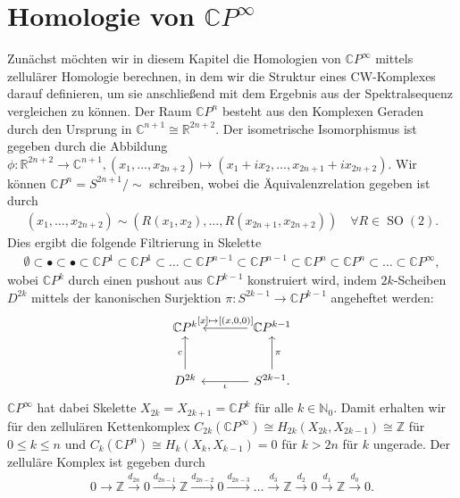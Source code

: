 \documentclass[12pt, hidelinks]{article}
\numberwithin{conj}{section}
\begin{document}
\section{Homologie von $\mathbb{C}P^\infty$}
Zunächst möchten wir in diesem Kapitel die Homologien von $\mathbb{C}P^\infty$ mittels zellulärer Homologie berechnen, in dem wir die Struktur eines CW-Komplexes darauf definieren, um sie anschließend mit dem Ergebnis aus der Spektralsequenz vergleichen zu können. Der Raum $\mathbb{C}P^n$ besteht aus den Komplexen Geraden durch den Ursprung in $\mathbb{C}^{n+1} \cong \mathbb{R}^{2n+2}$. Der isometrische Isomorphismus ist gegeben durch die Abbildung $\phi: \mathbb{R}^{2n+2} \to \mathbb{C}^{n+1}, (x_1, \ldots, x_{2n+2}) \mapsto (x_1 + ix_2, \ldots, x_{2n+1} + ix_{2n+2})$. Wir können $\mathbb{C}P^n = S^{2n+1} / \sim$ schreiben, wobei die Äquivalenzrelation gegeben ist durch
\begin{align}
(x_1, \ldots, x_{2n+2}) \sim (R(x_1,x_2),\ldots,R(x_{2n+1},x_{2n+2})) \quad \forall R \in \operatorname{SO}(2).
\end{align}
Dies ergibt die folgende Filtrierung in Skelette
\begin{align*}
\emptyset \subset \bullet \subset \bullet \subset \mathbb{C}P^1 \subset \mathbb{C}P^1 \subset \ldots \subset \mathbb{C}P^{n-1} \subset \mathbb{C}P^{n-1} \subset \mathbb{C}P^n \subset \mathbb{C}P^n \subset \ldots \subset \mathbb{C}P^\infty,
\end{align*}
wobei $\mathbb{C}P^k$ durch einen pushout aus $\mathbb{C}P^{k-1}$ konstruiert wird, indem $2k$-Scheiben $D^{2k}$ mittels der kanonischen Surjektion $\pi: S^{2k-1} \to \mathbb{C}P^{k-1}$ angeheftet werden:
\[\begin{tikzcd}[sep=large]
    {\mathbb{C}P^k} & {\mathbb{C}P^{k-1}} \\
    {D^{2k}} & {S^{2k-1}}.
    \arrow["{[x] \mapsto[(x,0,0)]}"', from=1-2, to=1-1]
    \arrow["c", from=2-1, to=1-1]
    \arrow["\pi"', from=2-2, to=1-2]
    \arrow["\iota", from=2-2, to=2-1]
\end{tikzcd}\]
$\mathbb{C}P^\infty$ hat dabei Skelette $X_{2k} = X_{2k+1} = \mathbb{C}P^k$ für alle $k \in \mathbb{N}_0$. Damit erhalten wir für den zellulären Kettenkomplex $C_{2k}(\mathbb{C}P^\infty) \cong H_{2k}(X_{2k},X_{2k-1}) \cong \mathbb{Z}$ für $0 \leq k \leq n$ und $C_k(\mathbb{C}P^n) \cong H_k(X_k,X_{k-1}) = 0$ für $k > 2n$ für $k$ ungerade. Der zelluläre Komplex ist gegeben durch
\begin{align}
0 \to \mathbb{Z} \xrightarrow{d_{2n}} 0 \xrightarrow{d_{2n-1}} \mathbb{Z} \xrightarrow{d_{2n-2}} 0 \xrightarrow{d_{2n-3}} \ldots \xrightarrow{d_{3}} \mathbb{Z} \xrightarrow{d_{2}} 0 \xrightarrow{d_{1}} \mathbb{Z} \xrightarrow{d_0}0.
\end{align}
\end{document}

